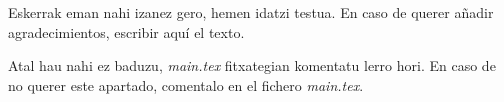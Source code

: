 \thispagestyle{empty}

Eskerrak eman nahi izanez gero, hemen idatzi testua. En caso de querer añadir agradecimientos, escribir aquí el texto. 

Atal hau nahi ez baduzu, \textit{main.tex} fitxategian komentatu lerro hori. En caso de no querer este apartado, comentalo en el fichero \textit{main.tex}.

